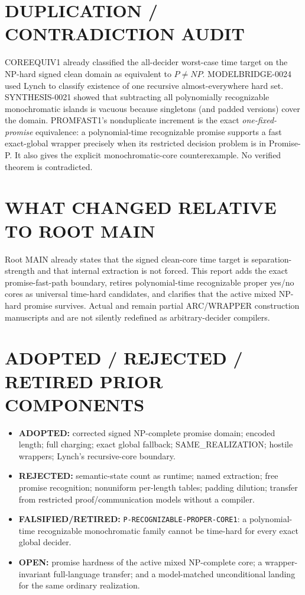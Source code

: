 \documentclass[11pt]{article}
\begin{document}
\section{DUPLICATION / CONTRADICTION AUDIT}
COREEQUIV1 already classified the all-decider worst-case time target on the
NP-hard signed clean domain as equivalent to $P\ne NP$.  MODELBRIDGE-0024
used Lynch to classify existence of one recursive almost-everywhere hard set.
SYNTHESIS-0021 showed that subtracting all polynomially recognizable
monochromatic islands is vacuous because singletons (and padded versions)
cover the domain.  PROMFAST1's nonduplicate increment is the exact
\emph{one-fixed-promise} equivalence: a polynomial-time recognizable promise
supports a fast exact-global wrapper precisely when its restricted decision
problem is in Promise-P.  It also gives the explicit monochromatic-core
counterexample.  No verified theorem is contradicted.

\section{WHAT CHANGED RELATIVE TO ROOT MAIN}
Root MAIN already states that the signed clean-core time target is
separation-strength and that internal extraction is not forced.  This report
adds the exact promise-fast-path boundary, retires polynomial-time
recognizable proper yes/no cores as universal time-hard candidates, and
clarifies that the active mixed NP-hard promise survives.  Actual
 and  remain partial ARC/WRAPPER construction
manuscripts and are not silently redefined as arbitrary-decider compilers.

\section{ADOPTED / REJECTED / RETIRED PRIOR COMPONENTS}
\begin{itemize}[leftmargin=*]
\item \textbf{ADOPTED:} corrected signed NP-complete promise domain; encoded
length; full charging; exact global fallback; SAME\_REALIZATION; hostile
wrappers; Lynch's recursive-core boundary.
\item \textbf{REJECTED:} semantic-state count as runtime; named extraction;
free promise recognition; nonuniform per-length tables; padding dilution;
transfer from restricted proof/communication models without a compiler.
\item \textbf{FALSIFIED/RETIRED:}
\texttt{P-RECOGNIZABLE-PROPER-CORE1}: a polynomial-time recognizable
monochromatic family cannot be time-hard for every exact global decider.
\item \textbf{OPEN:} promise hardness of the active mixed NP-complete core;
a wrapper-invariant full-language transfer; and a model-matched unconditional
landing for the same ordinary realization.
\end{itemize}
\end{document}
